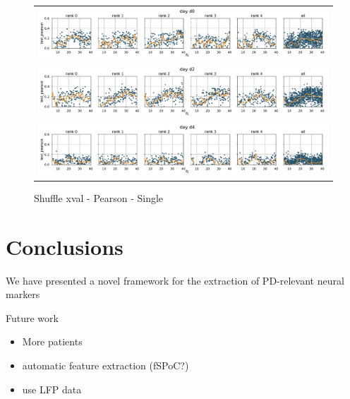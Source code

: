 \documentclass[10pt,a4paper]{article}
\begin{document}
\begin{figure}
\centering
\begin{tabular}{c}
	\includegraphics[width=\perfwidth\textwidth]{figures/par_sweep/test_pearson_fc_d0_Shuffle_Single}\\
	\includegraphics[width=\perfwidth\textwidth]{figures/par_sweep/test_pearson_fc_d2_Shuffle_Single}\\
	\includegraphics[width=\perfwidth\textwidth]{figures/par_sweep/test_pearson_fc_d4_Shuffle_Single}
\end{tabular}
\caption{Shuffle xval - Pearson - Single} 
\end{figure}



\section{Conclusions}
We have presented a novel framework for the extraction of PD-relevant neural markers




Future work
\begin{itemize}
\item More patients
\item automatic feature extraction (fSPoC?)
\item use LFP data
\end{itemize}
\end{document}

